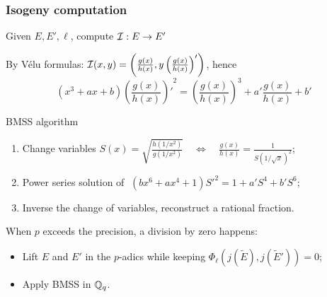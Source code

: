\documentclass[10pt,usepdftitle=false]{beamer}
\begin{document}
\begin{frame}
  \frametitle{Isogeny computation}
  
  \vspace{-4mm}

  \begin{center}
    \large
    Given $E, E', \ell$, compute $\mathcal{I}:E\to E'$
  \end{center}

  By Vélu formulas:
  $\mathcal{I}(x,y) = \left(\frac{g(x)}{h(x)}, y\left(\frac{g(x)}{h(x)}\right)'\right)$,
  hence
  \[(x^3 + ax + b){\left(\frac{g(x)}{h(x)}\right)'}^2 =
  \left(\frac{g(x)}{h(x)}\right)^3 + a'\frac{g(x)}{h(x)} + b'\]
  
  \vspace{-1mm}

  \begin{block}{BMSS algorithm \parencite{bostan+morain+salvy+schost08}}
    \begin{enumerate}
    \item Change variables $ S(x) =
      \sqrt{\frac{h(1/x^2)}{g(1/x^2)}} \quad\Leftrightarrow\quad
      \frac{g(x)}{h(x)} = \frac{1}{S(1/\sqrt{x})^2}$;
    \item Power series solution of 
      $\;(bx^6 + ax^4 + 1){S'}^2 = 1 + a'S^4 + b'S^6$;
    \item Inverse the change of variables, reconstruct a rational
      fraction.
    \end{enumerate}
  \end{block}

  \vspace{-1mm}

  \begin{block}{\cite{lercier+sirvent08}}
    When $p$ exceeds the precision, a division by zero happens:
    \begin{itemize}
    \item Lift $E$ and $E'$ in the $p$-adics while keeping $\Phi_\ell\left(j(\tilde{E}),j(\tilde{E}')\right)=0$;
    \item Apply BMSS in $\mathbb{Q}_q$.
    \end{itemize}
  \end{block}
\end{frame}

\end{document}
